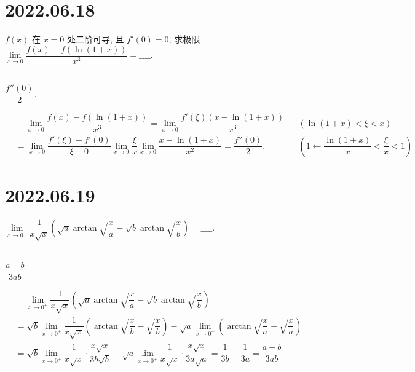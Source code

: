 \documentclass[lang=cn,12pt]{elegantbook}
\begin{document}
\section*{2022.06.18}

$f(x)$ 在 $x = 0$ 处二阶可导, 且 $f'(0)= 0$, 求极限 $
\lim\limits_{x \to 0} \dfrac{
  f(x) - f(\ln (1+x))}{x^3} = \_\_\_\_.$
\\ \\

\begin{solution}
  $\dfrac{f''(0)}{2}.$

  $\begin{aligned}
  &\quad\  \lim\limits_{x \to 0} \dfrac{
    f(x) - f(\ln (1+x))}{x^3}
  = \lim\limits_{x \to 0} \dfrac{
    f'(\xi)(x-\ln(1+x))}{x^3} && (\ln(1+x) < \xi < x)\\
  &= \lim\limits_{x \to 0} \dfrac{
    f'(\xi)-f'(0)}{\xi-0} \lim\limits_{x \to 0} \dfrac{
      \xi}{x}  \lim\limits_{x \to 0} \dfrac{
        x-\ln(1+x)}{x^2} 
  = \dfrac{f''(0)}{2}. && \left(1\gets \dfrac{\ln(1+x)}{x} <
    \dfrac{\xi}{x} < 1\right)
  \end{aligned}
  $
\end{solution}

\section*{2022.06.19}

$\lim\limits_{x \to 0^{+}} \dfrac{
  1}{x\sqrt{x}}\left(\sqrt{a}\arctan \sqrt{\dfrac{x}{a}} - 
    \sqrt{b}\arctan \sqrt{\dfrac{x}{b}}\right) = \_\_\_\_.$
\\ \\

\begin{solution}
  $\dfrac{a-b}{3ab}.$

  $\begin{aligned}
  &\quad \ \lim\limits_{x \to 0^{+}} \dfrac{
    1}{x\sqrt{x}}\left(\sqrt{a}\arctan \sqrt{\dfrac{x}{a}} - 
      \sqrt{b}\arctan \sqrt{\dfrac{x}{b}}\right)\\
  &= \sqrt{b} \lim\limits_{x \to 0^{+}}\dfrac{1}{x\sqrt{x}} 
    \left(\arctan \sqrt{\dfrac{x}{b}} - \sqrt{\dfrac{x}{b}} \right) 
    - \sqrt{a} \lim\limits_{x \to 0^{+}} \left(\arctan \sqrt{\dfrac{x}{a}} - 
    \sqrt{\dfrac{x}{a}} \right)
    \\
  &= \sqrt{b} \lim\limits_{x \to 0^{+}}\dfrac{1}{x\sqrt{x}}\cdot 
    \dfrac{x\sqrt{x}}{3b\sqrt{b}} -
    \sqrt{a} \lim\limits_{x \to 0^{+}}\dfrac{1}{x\sqrt{x}}\cdot 
    \dfrac{x\sqrt{x}}{3a\sqrt{a}}
  = \dfrac{1}{3b} - \dfrac{1}{3a} = \dfrac{a-b}{3ab}
  \end{aligned}
  $
\end{solution}
\end{document}
